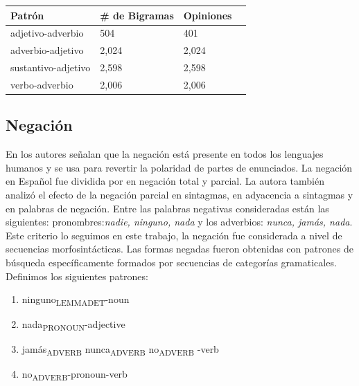 \documentclass[a0,portrait]{a0poster}
\begin{document}
\begin{multicols}{2}
\begin{center}\vspace{1cm}
\begin{tabular}{l l l l}
\toprule
\textbf{Patrón}&\textbf{\# de Bigramas}&\textbf{Opiniones} \\
\midrule
adjetivo-adverbio & 504 & 401\\
adverbio-adjetivo & 2,024 & 2,024\\
sustantivo-adjetivo & 2,598 & 2,598\\
verbo-adverbio & 2,006 & 2,006\\
\bottomrule
\end{tabular}
\end{center}\vspace{1cm}


\subsection*{Negación}

En \cite{blanco2011semantic} los autores señalan que la negación está presente en todos los lenguajes humanos y se usa para revertir la polaridad de partes de enunciados.  La negación en Español fue dividida por \cite{ref3} en negación total y parcial. La autora también analizó el efecto de la negación parcial en sintagmas, en adyacencia a sintagmas y en palabras de negación. Entre las palabras negativas consideradas están las siguientes: pronombres:\textit{nadie, ninguno, nada} y los adverbios: \textit{nunca, jamás, nada}. Este criterio lo seguimos en este trabajo, la negación fue considerada a nivel de secuencias morfosintácticas. Las formas negadas fueron obtenidas con patrones de búsqueda específicamente formados por secuencias de categorías gramaticales. Definimos los siguientes patrones:


\begin{enumerate}
\item ninguno\textsubscript{LEMMA\textunderscore DET}-noun

\item nada\textsubscript{PRONOUN}-adjective

\item \lbrack jamás\textsubscript{ADVERB} \textbar nunca\textsubscript{ADVERB} \textbar no\textsubscript{ADVERB} \rbrack -verb

\item no\textsubscript{ADVERB}-pronoun-verb


\end{enumerate}
\end{multicols}
\end{document}
